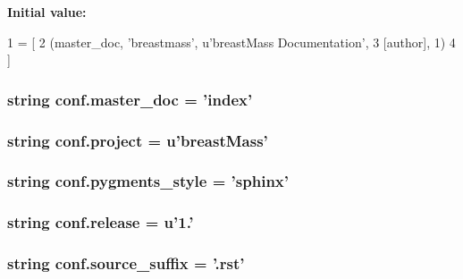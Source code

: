 {\bfseries Initial value\-:}
\begin{DoxyCode}
1 = [
2     (master\_doc, \textcolor{stringliteral}{'breastmass'}, \textcolor{stringliteral}{u'breastMass Documentation'},
3      [author], 1)
4 ]
\end{DoxyCode}
\hypertarget{namespaceconf_a6fcd7e5236f355b1e1a55f9d95988810}{
\subsubsection[{master\-\_\-doc}]{\setlength{\rightskip}{0pt plus 5cm}string conf.\-master\-\_\-doc = 'index'}}\label{namespaceconf_a6fcd7e5236f355b1e1a55f9d95988810}
\hypertarget{namespaceconf_a45653c983098153b78e33600e39230eb}{
\subsubsection[{project}]{\setlength{\rightskip}{0pt plus 5cm}string conf.\-project = u'breast\-Mass'}}\label{namespaceconf_a45653c983098153b78e33600e39230eb}
\hypertarget{namespaceconf_a641130e096b26cba8a5d63ed38684de7}{
\subsubsection[{pygments\-\_\-style}]{\setlength{\rightskip}{0pt plus 5cm}string conf.\-pygments\-\_\-style = 'sphinx'}}\label{namespaceconf_a641130e096b26cba8a5d63ed38684de7}
\hypertarget{namespaceconf_a325dc746d8bf05c54d26351c35a21d90}{
\subsubsection[{release}]{\setlength{\rightskip}{0pt plus 5cm}string conf.\-release = u'1.'}}\label{namespaceconf_a325dc746d8bf05c54d26351c35a21d90}
\hypertarget{namespaceconf_a10af2a769eb3bd3322e874f677e435b1}{
\subsubsection[{source\-\_\-suffix}]{\setlength{\rightskip}{0pt plus 5cm}string conf.\-source\-\_\-suffix = '.rst'}}\label{namespaceconf_a10af2a769eb3bd3322e874f677e435b1}
